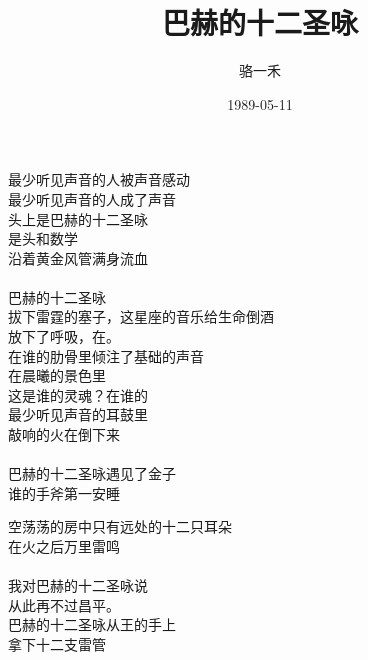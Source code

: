 \documentclass{article}
\title{巴赫的十二圣咏}
\author{骆一禾}
\date{1989-05-11}
\begin{document}

\maketitle

\setlength\parindent{0pt}

\begin{center}

\begin{minipage}{0.5\linewidth}

\Large

﻿最少听见声音的人被声音感动 \\
最少听见声音的人成了声音 \\
头上是巴赫的十二圣咏 \\
是头和数学 \\
沿着黄金风管满身流血 \\
 \\
巴赫的十二圣咏 \\
拔下雷霆的塞子，这星座的音乐给生命倒酒 \\
放下了呼吸，在。 \\
在谁的肋骨里倾注了基础的声音 \\
在晨曦的景色里 \\
这是谁的灵魂？在谁的 \\
最少听见声音的耳鼓里 \\
敲响的火在倒下来 \\
 \\
巴赫的十二圣咏遇见了金子 \\
谁的手斧第一安睡 \\

\end{minipage}

\newpage

\begin{minipage}{0.5\linewidth}

\Large

空荡荡的房中只有远处的十二只耳朵 \\
在火之后万里雷鸣 \\
 \\
我对巴赫的十二圣咏说 \\
从此再不过昌平。 \\
巴赫的十二圣咏从王的手上 \\
拿下十二支雷管\end{minipage}

\end{center}
\end{document}
